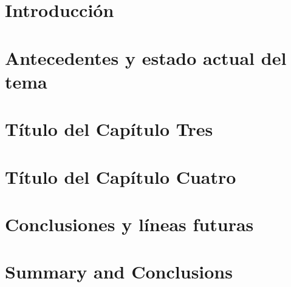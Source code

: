 \documentclass[spanish,a4paper,14pt,oneside]{extreport}
\begin{document}
   
  \chapter{Introducción}
  \label{chapter:intro}
   
  
   
   
  \chapter{Antecedentes y estado actual del tema}
  \label{chapter:Estadodelarte}
   
  
   
  \newpage{\pagestyle{empty}}
  \thispagestyle{empty}
   
  \chapter{Título del Capítulo Tres}
  \label{chapter:tres}
   
  
   
   
  \chapter{Título del Capítulo Cuatro}
  \label{chapter:cuatro}
   
  
   
  \newpage{\pagestyle{empty}}
  \thispagestyle{empty}
   
  \chapter{Conclusiones y líneas futuras}
  \label{chapter:Conclusiones}
   
  
   
  \newpage{\pagestyle{empty}}
  \thispagestyle{empty}
   
  \chapter{Summary and Conclusions }
  \label{chapter:ingles}
   
\end{document}
